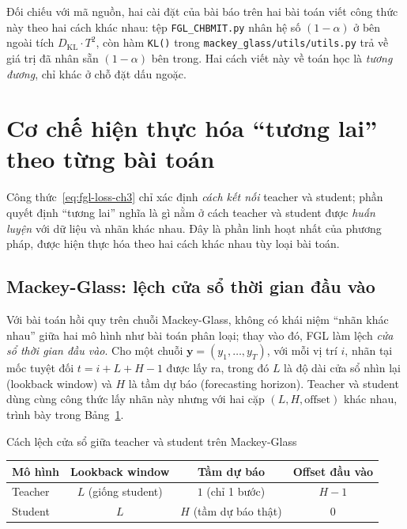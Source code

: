 Đối chiếu với mã nguồn, hai cài đặt của bài báo trên hai bài toán viết công thức này theo hai
cách khác nhau: tệp \texttt{FGL\_CHBMIT.py} nhân hệ số $(1-\alpha)$ ở bên ngoài tích
$D_{\mathrm{KL}} \cdot T^2$, còn hàm \texttt{KL()} trong \texttt{mackey\_glass/utils/utils.py}
trả về giá trị đã nhân sẵn $(1-\alpha)$ bên trong. Hai cách viết này về toán học là
\textit{tương đương}, chỉ khác ở chỗ đặt dấu ngoặc.

\section{Cơ chế hiện thực hóa ``tương lai'' theo từng bài toán}
\label{sec:cochetuonglai}

Công thức~\eqref{eq:fgl-loss-ch3} chỉ xác định \textit{cách kết nối} teacher và student;
phần quyết định ``tương lai'' nghĩa là gì nằm ở cách teacher và student được \textit{huấn
luyện} với dữ liệu và nhãn khác nhau. Đây là phần linh hoạt nhất của phương pháp, được hiện
thực hóa theo hai cách khác nhau tùy loại bài toán.

\subsection{Mackey-Glass: lệch cửa sổ thời gian đầu vào}

Với bài toán hồi quy trên chuỗi Mackey-Glass, không có khái niệm ``nhãn khác nhau'' giữa hai
mô hình như bài toán phân loại; thay vào đó, FGL làm lệch \textit{cửa sổ thời gian đầu vào}.
Cho một chuỗi $\mathbf{y} = (y_1, \dots, y_T)$, với mỗi vị trí $i$, nhãn tại mốc tuyệt đối
$t = i + L + H - 1$ được lấy ra, trong đó $L$ là độ dài cửa sổ nhìn lại (lookback window) và
$H$ là tầm dự báo (forecasting horizon). Teacher và student dùng cùng công thức lấy nhãn này
nhưng với hai cặp $(L, H, \text{offset})$ khác nhau, trình bày trong
Bảng~\ref{bang:mg-offset}.

\begin{table}[H]{Cách lệch cửa sổ giữa teacher và student trên Mackey-Glass}
	\label{bang:mg-offset}
	\centering
	\begin{tabular}{lccc}
		\toprule
		\textbf{Mô hình} & \textbf{Lookback window} & \textbf{Tầm dự báo} & \textbf{Offset đầu vào} \\
		\midrule
		Teacher & $L$ (giống student) & $1$ (chỉ 1 bước) & $H - 1$ \\
		Student & $L$ & $H$ (tầm dự báo thật) & $0$ \\
		\bottomrule
	\end{tabular}
\end{table}

